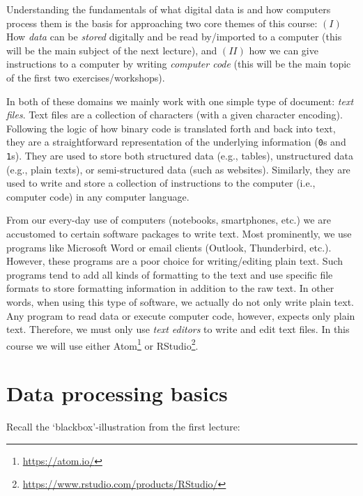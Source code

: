 \documentclass[
  12pt,
]{style/krantz}
\renewcommand{\href}[2]{#2\footnote{\url{#1}}}
\begin{document}
Understanding the fundamentals of what digital data is and how computers process them is the basis for approaching two core themes of this course: \((I)\) How \emph{data} can be \emph{stored} digitally and be read by/imported to a computer (this will be the main subject of the next lecture), and \((II)\) how we can give instructions to a computer by writing \emph{computer code} (this will be the main topic of the first two exercises/workshops).

In both of these domains we mainly work with one simple type of document: \emph{text files}. Text files are a collection of characters (with a given character encoding). Following the logic of how binary code is translated forth and back into text, they are a straightforward representation of the underlying information (\texttt{0}s and \texttt{1}s). They are used to store both structured data (e.g., tables), unstructured data (e.g., plain texts), or semi-structured data (such as websites). Similarly, they are used to write and store a collection of instructions to the computer (i.e., computer code) in any computer language.

From our every-day use of computers (notebooks, smartphones, etc.) we are accustomed to certain software packages to write text. Most prominently, we use programs like Microsoft Word or email clients (Outlook, Thunderbird, etc.). However, these programs are a poor choice for writing/editing plain text. Such programs tend to add all kinds of formatting to the text and use specific file formats to store formatting information in addition to the raw text. In other words, when using this type of software, we actually do not only write plain text. Any program to read data or execute computer code, however, expects only plain text. Therefore, we must only use \emph{text editors} to write and edit text files. In this course we will use either \href{https://atom.io/}{Atom} or \href{https://www.rstudio.com/products/RStudio/}{RStudio}.

\hypertarget{data-processing-basics}{%
\section{Data processing basics}\label{data-processing-basics}}

Recall the `blackbox'-illustration from the first lecture:
\end{document}

